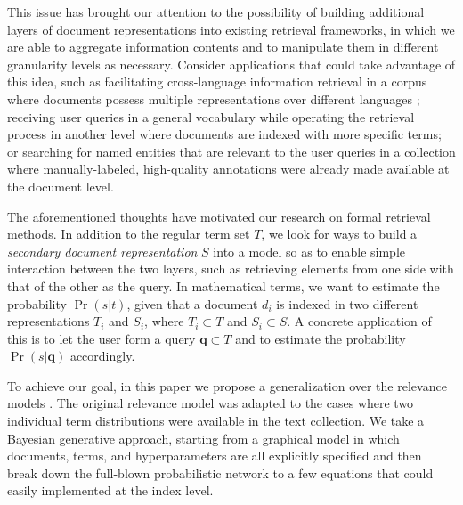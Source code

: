 This issue has brought our attention to the possibility of building additional
layers of document representations into existing retrieval frameworks, in which
we are able to aggregate information contents and to manipulate them in
different granularity levels as necessary.  Consider applications that could
take advantage of this idea, such as facilitating cross-language information
retrieval in a corpus where documents possess multiple representations over
different languages \cite{lavrenko2002cross-lingual}; receiving user queries in
a general vocabulary while operating the retrieval process in another level
where documents are indexed with more specific terms; or searching for named
entities that are relevant to the user queries in a collection where
manually-labeled, high-quality annotations were already made available at the
document level.  

The aforementioned thoughts have motivated our research on formal retrieval
methods.  In addition to the regular term set $T$, we look {for} ways to build
a {\it secondary document representation} $S$ into a model so as to enable
simple interaction between the two layers, such as retrieving elements from one
side with that of the other as the query.  In mathematical terms, we want to
estimate the probability $\Pr(s|t)$, given that a document $d_i$ is indexed in
two different representations $T_i$ and $S_i$, where $T_i \subset T$ and $S_i
\subset S$.  A concrete application of this is to let the user form a query
$\mathbf{q} \subset T$ and to estimate the probability $\Pr(s|\mathbf{q})$
accordingly.

To achieve our goal, in this paper we propose a generalization over the
relevance models \cite{lavrenko2001relevance,lavrenko2002cross-lingual}.  The
original relevance model was adapted to the cases where two individual term
distributions were available in the text collection.  We take a Bayesian
generative approach, starting from a graphical model in which documents, terms,
and hyperparameters are all explicitly specified and then break down the
full-blown probabilistic network to a few equations that could easily
implemented at the index level.

